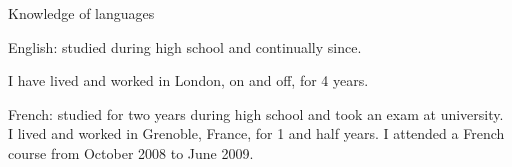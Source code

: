 \begin{rubric}{Knowledge of languages}

\entry*[12 years]
English: studied during high school and continually since.


I have lived and worked in London, on and off, for 4 years.

\entry*[3 years]
French: studied for two years during high school and took an exam
at university.
I lived and worked in Grenoble, France, for 1 and half years.
I attended a French course from October 2008 to June 2009.

\end{rubric}
